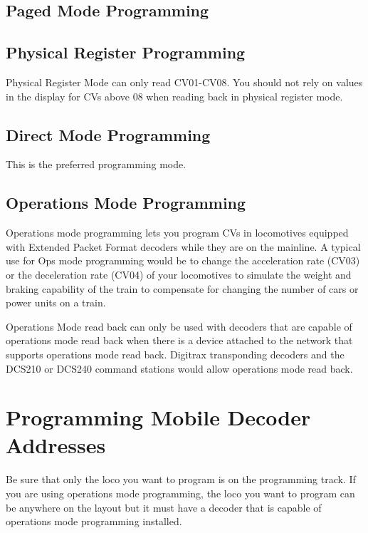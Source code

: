 \subsection{Paged Mode Programming}

\subsection{Physical Register Programming}
Physical Register Mode can only read CV01-CV08. You should not rely on values in the display for CVs above 08 when reading back in physical register mode.

\subsection{Direct Mode Programming}
This is the preferred programming mode.

\subsection{Operations Mode Programming}
Operations mode programming lets you program CVs in locomotives equipped with Extended Packet Format decoders while they are on the mainline. A typical use for Ops mode programming would be to change the acceleration rate (CV03) or the deceleration rate (CV04) of your locomotives to simulate the weight and braking capability of the train to compensate for changing the number of cars or power units on a train.

Operations Mode read back can only be used with decoders that are capable of operations mode read back when there is a device attached to the network that supports operations mode read back. Digitrax transponding decoders and the DCS210 or DCS240 command stations would allow operations mode read back.

\section{Programming Mobile Decoder Addresses}

Be sure that only the loco you want to program is on the programming track. If you are using operations mode programming, the loco you want to program can be anywhere on the layout but it must have a decoder that is capable of operations mode programming installed.


